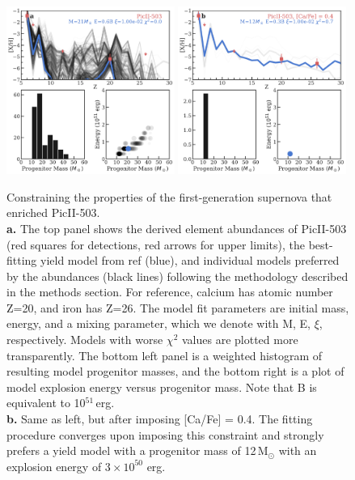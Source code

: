 \documentclass[pdflatex,sn-nature]{sn-jnl}%
\theoremstyle{thmstyleone}%
\theoremstyle{thmstyletwo}%
\theoremstyle{thmstylethree}%
\begin{document}
\begin{figure}[h]
\centering
\includegraphics[width=0.49\textwidth]{picII-503_origv2.pdf}
\includegraphics[width=0.49\textwidth]{picII-503_cafe04v2.pdf}
\caption{Constraining the properties of the first-generation supernova that enriched PicII-503.\\
\textbf{a.} The top panel shows the derived element abundances of PicII-503 (red squares for detections, red arrows for upper limits), the best-fitting yield model from ref\cite{hw+10} (blue), and individual models preferred by the abundances (black lines) following the methodology described in the methods section.
For reference, calcium has atomic number Z=20, and iron has Z=26.
The model fit parameters are initial mass, energy, and a mixing parameter, which we denote with M, E, $\xi$, respectively. 
Models with worse $\chi^2$ values are plotted more transparently. 
The bottom left panel is a weighted histogram of resulting model progenitor masses, and the bottom right is a plot of model explosion energy versus progenitor mass.
Note that B is equivalent to 10$^{51}$\,erg.\\
\textbf{b.} Same as left, but after imposing [Ca/Fe] = 0.4. The fitting procedure converges upon imposing this constraint and strongly prefers a yield model with a progenitor mass of 12\,M$_\odot$ with an explosion energy of $3 \times 10^{50}$ erg. 
}
\label{fig:yields}
\end{figure}
\end{document}
